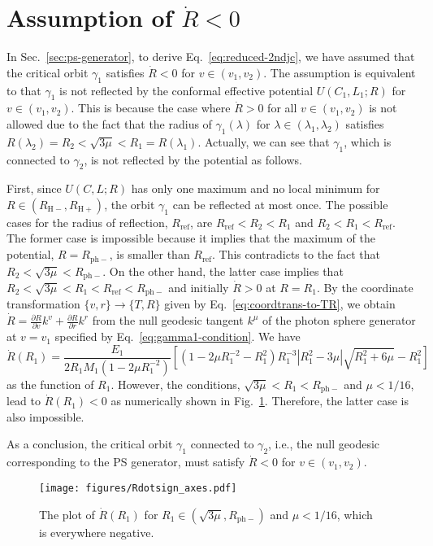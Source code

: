 \documentclass[prd,showpacs,preprintnumbers,groupedaddress,superscriptaddress,nofootinbib,11pt]{revtex4-1} %
\theoremstyle{newplain}
\newcommand{\mr}[1]{\mathrm{#1}}
\begin{document}
\section{Assumption of $\dot{R}<0$}
\label{sec:Rdotsign}
In Sec.~\ref{sec:ps-generator}, to derive Eq.~\eqref{eq:reduced-2ndjc}, we have assumed that the critical orbit $\gamma_1$ satisfies $\dot{R}<0$ for $v\in(v_1,v_2)$.
The assumption is equivalent to that $\gamma_1$ is not reflected by the conformal effective potential $U(C_1,L_1;R)$ for $v\in(v_1,v_2)$.
This is because the case where $\dot{R}>0$ for all $v\in(v_1,v_2)$ is not allowed due to the fact that the radius of $\gamma_1(\lambda)$ for $\lambda\in(\lambda_1,\lambda_2)$ satisfies $R(\lambda_2)=R_2<\sqrt{3\mu}<R_1=R(\lambda_1)$.
Actually, we can see that $\gamma_1$, which is connected to $\gamma_2$, is not reflected by the potential as follows.
\par
First, since $U(C,L;R)$ has only one maximum and no local minimum for $R\in(R_{\mr{H}-},R_{\mr{H}+})$, the orbit $\gamma_1$ can be reflected at most once.
The possible cases for the radius of reflection, $R_{\mr{ref}}$, are $R_{\mr{ref}}<R_2<R_1$ and $R_2<R_1<R_{\mr{ref}}$.
The former case is impossible because it implies that the maximum of the potential, $R=R_{\mr{ph}-}$, is smaller than $R_{\mr{ref}}$.
This contradicts to the fact that $R_2<\sqrt{3\mu}<R_{\mr{ph}-}$.
On the other hand, the latter case implies that $R_2<\sqrt{3\mu}<R_1<R_{\mr{ref}}<R_{\mr{ph}-}$ and initially $\dot{R}>0$ at $R=R_1$.
By the coordinate transformation $\{v,r\}\to\{T,R\}$ given by Eq.~\eqref{eq:coordtrans-to-TR}, we obtain $\dot R=\frac{\partial R}{\partial v}k^v+\frac{\partial R}{\partial r}k^r$ from the null geodesic tangent $k^\mu$ of the photon sphere generator at $v=v_1$ specified by Eq.~\eqref{eq:gamma1-condition}.
We have
\begin{equation}
\dot{R}(R_1)=\frac{E_1}{2R_1M_1(1-2\mu R_1^{-2})}
\left[(1-2\mu R_1^{-2}-R_1^2)R_1^{-3}|R_1^2-3\mu|\sqrt{R_1^2+6\mu}-R_1^2\right]
\end{equation}
as the function of $R_1$.
However, the conditions, $\sqrt{3\mu}<R_1<R_{\mr{ph}-}$ and $\mu<1/16$, lead to $\dot{R}(R_1)<0$ as numerically shown in Fig.~\ref{fig:Rdotsign}.
Therefore, the latter case is also impossible.
\par
As a conclusion, the critical orbit $\gamma_1$ connected to $\gamma_2$, i.e., the null geodesic corresponding to the PS generator, must satisfy $\dot{R}<0$ for $v\in(v_1,v_2)$.
\begin{figure}[h]
\texttt{[image: figures/Rdotsign\_axes.pdf]}
\caption{
\label{fig:Rdotsign}
The plot of $\dot{R}(R_1)$ for $R_1\in(\sqrt{3\mu},R_{\mr{ph}-})$ and $\mu<1/16$, which is everywhere negative.
}
\end{figure}
\end{document}
